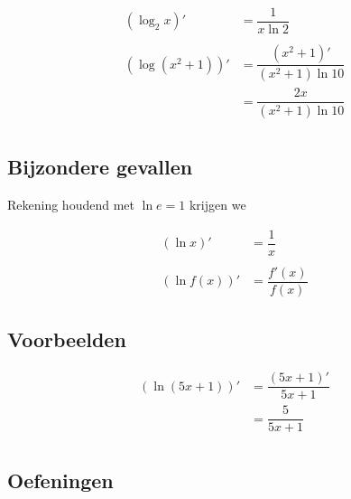 \documentclass[12pt,twoside,a4paper]{article}
\begin{document}
\begin{align*}
  \left(\log_2 x\right)'    & = \dfrac{1}{x\ln 2}               \\\\
  \left(\log(x^2+1)\right)' & = \dfrac{(x^2+1)'}{(x^2+1)\ln 10} \\
                            & = \dfrac{2x}{(x^2+1)\ln 10}       \\
\end{align*}

\subsection{Bijzondere gevallen}

Rekening houdend met $\ln e = 1$ krijgen we

\begin{align*}
  (\ln x)'    & = \dfrac{1}{x} \\\\
  (\ln f(x))' & = \dfrac{f'(x)}{f(x)}
\end{align*}

\subsection{Voorbeelden}

\begin{align*}
\left(\ln(5x+1)\right)' &= \dfrac{(5x+1)'}{5x+1}\\
                        &= \dfrac{5}{5x+1}\\
\end{align*}

\subsection{Oefeningen}
\end{document}
